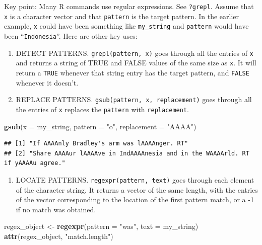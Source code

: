 \documentclass[]{book}
\newenvironment{Shaded}{\begin{snugshade}}{\end{snugshade}}
\newcommand{\DataTypeTok}[1]{\textcolor[rgb]{0.13,0.29,0.53}{#1}}
\newcommand{\KeywordTok}[1]{\textcolor[rgb]{0.13,0.29,0.53}{\textbf{#1}}}
\newcommand{\NormalTok}[1]{#1}
\newcommand{\StringTok}[1]{\textcolor[rgb]{0.31,0.60,0.02}{#1}}
\providecommand{\tightlist}{%
  \setlength{\itemsep}{0pt}\setlength{\parskip}{0pt}}
\theoremstyle{definition}
\theoremstyle{definition}
\theoremstyle{definition}
\theoremstyle{remark}
\begin{document}
\begin{Shaded}
\begin{Highlighting}[]
\begin{Shaded}
\begin{Highlighting}[]
\begin{Shaded}
\begin{Highlighting}[]
Key point: Many R commands use regular expressions. See \texttt{?grepl}. Assume that \texttt{x} is a character vector and that \texttt{pattern} is the target pattern. In the earlier example, \texttt{x} could have been something like \texttt{my\_string} and \texttt{pattern} would have been ``\texttt{Indonesia}''. Here are other key uses:

\begin{enumerate}
\def\labelenumi{\arabic{enumi}.}
\item
  DETECT PATTERNS. \texttt{grepl(pattern,\ x)} goes through all the entries of \texttt{x} and returns a string of TRUE and FALSE values of the same size as \texttt{x}. It will return a \texttt{TRUE} whenever that string entry has the target pattern, and \texttt{FALSE} whenever it doesn't.
\item
  REPLACE PATTERNS. \texttt{gsub(pattern,\ x,\ replacement)} goes through all the entries of \texttt{x} replaces the \texttt{pattern} with \texttt{replacement}.
\end{enumerate}

\begin{Shaded}
\begin{Highlighting}[]
\KeywordTok{gsub}\NormalTok{(}\DataTypeTok{x =}\NormalTok{ my_string,}
     \DataTypeTok{pattern =} \StringTok{"o"}\NormalTok{, }
     \DataTypeTok{replacement =} \StringTok{"AAAA"}\NormalTok{)}
\end{Highlighting}
\end{Shaded}

\begin{verbatim}
## [1] "If AAAAnly Bradley's arm was lAAAAnger. RT"                                   
## [2] "Share AAAAur lAAAAve in IndAAAAnesia and in the WAAAArld. RT if yAAAAu agree."
\end{verbatim}

\begin{enumerate}
\def\labelenumi{\arabic{enumi}.}
\setcounter{enumi}{2}
\tightlist
\item
  LOCATE PATTERNS. \texttt{regexpr(pattern,\ text)} goes through each element of the character string. It returns a vector of the same length, with the entries of the vector corresponding to the location of the first pattern match, or a -1 if no match was obtained.
\end{enumerate}

\begin{Shaded}
\begin{Highlighting}[]
\NormalTok{regex_object <-}\StringTok{ }\KeywordTok{regexpr}\NormalTok{(}\DataTypeTok{pattern =} \StringTok{"was"}\NormalTok{,  }\DataTypeTok{text =}\NormalTok{ my_string)}
\KeywordTok{attr}\NormalTok{(regex_object, }\StringTok{"match.length"}\NormalTok{)}
\end{Highlighting}
\end{Shaded}


\end{Highlighting}
\end{Shaded}
\end{Highlighting}
\end{Shaded}
\end{Highlighting}
\end{Shaded}
\end{document}
